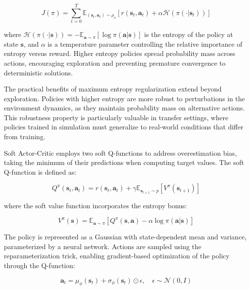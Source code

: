 \begin{equation}
J(\pi) = \sum_{t=0}^{T} \mathbb{E}_{(\mathbf{s}_t, \mathbf{a}_t) \sim \rho_\pi} \left[ r(\mathbf{s}_t, \mathbf{a}_t) + \alpha \mathcal{H}(\pi(\cdot | \mathbf{s}_t)) \right]
\end{equation}

where $\mathcal{H}(\pi(\cdot | \mathbf{s})) = -\mathbb{E}_{\mathbf{a} \sim \pi}[\log \pi(\mathbf{a} | \mathbf{s})]$ is the entropy of the policy at state $\mathbf{s}$, and $\alpha$ is a temperature parameter controlling the relative importance of entropy versus reward. Higher entropy policies spread probability mass across actions, encouraging exploration and preventing premature convergence to deterministic solutions.

The practical benefits of maximum entropy regularization extend beyond exploration. Policies with higher entropy are more robust to perturbations in the environment dynamics, as they maintain probability mass on alternative actions. This robustness property is particularly valuable in transfer settings, where policies trained in simulation must generalize to real-world conditions that differ from training.

Soft Actor-Critic employs two soft Q-functions to address overestimation bias, taking the minimum of their predictions when computing target values. The soft Q-function is defined as:

\begin{equation}
Q^\pi(\mathbf{s}_t, \mathbf{a}_t) = r(\mathbf{s}_t, \mathbf{a}_t) + \gamma \mathbb{E}_{\mathbf{s}_{t+1} \sim p} \left[ V^\pi(\mathbf{s}_{t+1}) \right]
\end{equation}

where the soft value function incorporates the entropy bonus:

\begin{equation}
V^\pi(\mathbf{s}) = \mathbb{E}_{\mathbf{a} \sim \pi} \left[ Q^\pi(\mathbf{s}, \mathbf{a}) - \alpha \log \pi(\mathbf{a} | \mathbf{s}) \right]
\end{equation}

The policy is represented as a Gaussian with state-dependent mean and variance, parameterized by a neural network. Actions are sampled using the reparameterization trick, enabling gradient-based optimization of the policy through the Q-function:

\begin{equation}
\mathbf{a}_t = \mu_\phi(\mathbf{s}_t) + \sigma_\phi(\mathbf{s}_t) \odot \epsilon, \quad \epsilon \sim \mathcal{N}(0, I)
\end{equation}

